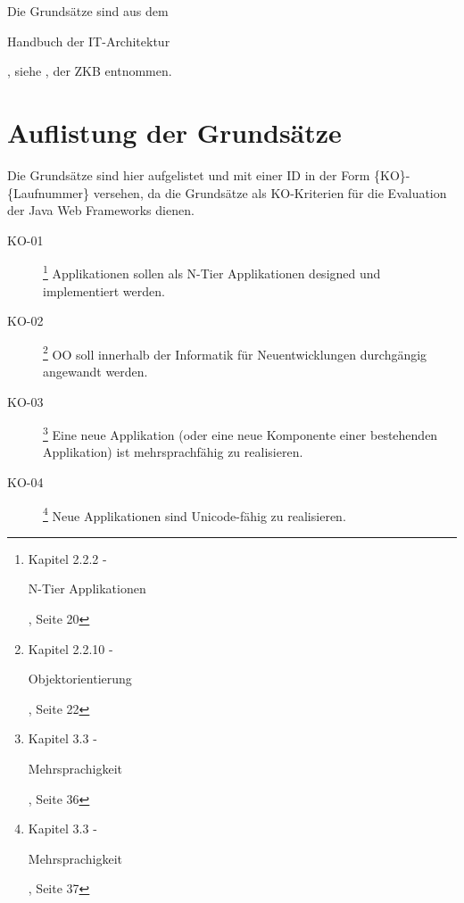   Die Grundsätze sind aus dem \begin{itshape}Handbuch der
  IT-Architektur\end{itshape}, siehe \cite{ZkbHandbuchDerItArchitektur}, der
  \ac{ZKB} entnommen.
  
  \section{Auflistung der Grundsätze}
  
  Die Grundsätze sind hier aufgelistet und mit einer ID in der Form
  \{KO\}-\{Laufnummer\} versehen, da die Grundsätze als KO-Kriterien für die
  Evaluation der Java Web Frameworks dienen.

  \begin{description}

    \item[KO-01\label{itm:KO-01}]
    \footnote{\cite{ZkbHandbuchDerItArchitektur} Kapitel 2.2.2 -
    \begin{itshape}N-Tier Applikationen\end{itshape}, Seite 20}
    Applikationen sollen als N-Tier Applikationen designed und
    implementiert werden.

    \item[KO-02\label{itm:KO-02}]
    \footnote{\cite{ZkbHandbuchDerItArchitektur} Kapitel 2.2.10 -
    \begin{itshape}Objektorientierung\end{itshape}, Seite 22}
    \ac{OO} soll innerhalb der Informatik für Neuentwicklungen
    durchgängig angewandt werden.

    \item[KO-03\label{itm:KO-03}]
    \footnote{\cite{ZkbHandbuchDerItArchitektur} Kapitel 3.3 -
    \begin{itshape}Mehrsprachigkeit\end{itshape}, Seite 36}
    Eine neue Applikation (oder eine neue Komponente einer
    bestehenden Applikation) ist mehrsprachfähig zu realisieren.

    \item[KO-04\label{itm:KO-04}]
    \footnote{\cite{ZkbHandbuchDerItArchitektur} Kapitel 3.3 -
    \begin{itshape}Mehrsprachigkeit\end{itshape}, Seite 37}
    Neue Applikationen sind Unicode-fähig zu realisieren.


\end{description}
